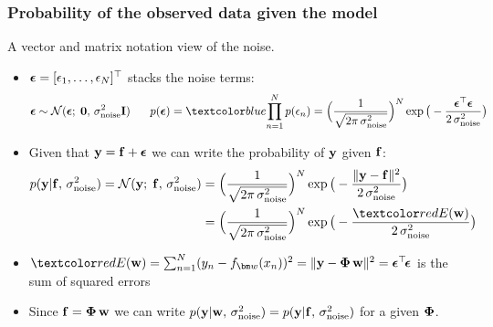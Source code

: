 \begin{frame}
\frametitle{Probability of the observed data given the model}

A vector and matrix notation view of the noise.
\begin{itemize}
\item $\boldsymbol{\epsilon}=[\epsilon_1,\ldots,\epsilon_N]^\top$ stacks the  noise terms:
%
\[
\bepsilon\sim\N(\bepsilon;\;\mathbf{0},\,\sigma_\mathrm{noise}^2\bfI)
\hspace{4ex}
p(\bepsilon)=\Blue{\prod_{n=1}^N p(\epsilon_n)}=
\Big(\frac{1}{\sqrt{2\pi\,\sigma_\mathrm{noise}^2}}\Big)^N
\exp{\big(-\frac{\bepsilon^\top\bepsilon}{2\,\sigma_\mathrm{noise}^2}\big)}
\]
% 
\item Given that $\mathbf y=\mathbf f+\boldsymbol{\epsilon}$ we can write the probability of $\mathbf y$ given $\mathbf f$:
%
\begin{align*}
p(\bfy|\bff,\,\sigma_\mathrm{noise}^2)=\N(\bfy;\;\bff,\,\sigma_\mathrm{noise}^2)
&=\Big(\frac{1}{\sqrt{2\pi\,\sigma_\mathrm{noise}^2}}\Big)^N
\exp{\big(-\frac{\|\bfy-\bff\|^2}{2\,\sigma_\mathrm{noise}^2}\big)}\\
&=\Big(\frac{1}{\sqrt{2\pi\,\sigma_\mathrm{noise}^2}}\Big)^N
\exp{\big(-\frac{\Red{E(\bfw)}}{2\,\sigma_\mathrm{noise}^2}\big)}
\end{align*}
%
\item
  $\Red{E(\bfw)}=\sum_{n=1}^N(y_n-f_{\bm w}(x_n))^2=\|\bfy-\bPhi\,\bfw\|^2
  = \bepsilon^\top\!\bepsilon$ is the sum of squared errors
\item Since $\mathbf f=\boldsymbol{\Phi}\,\mathbf w$ we can write 
$p(\mathbf y|\mathbf w,\,\sigma_\mathrm{noise}^2)=p(\mathbf y|\mathbf f,\,\sigma_\mathrm{noise}^2)$ for a given $\boldsymbol{\Phi}$.
\end{itemize}
\end{frame}



